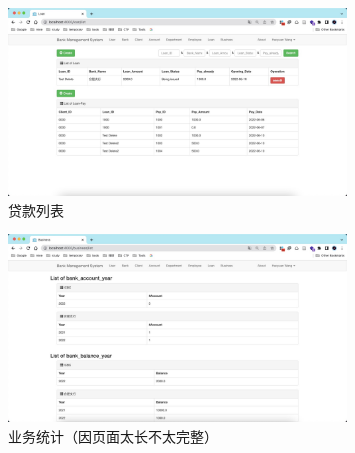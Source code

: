 \documentclass{article}
\begin{document}
    \begin{figure}[H]
        \centering
        \includegraphics[width=0.8\textwidth]{./fig/loan_list.jpg}
        \caption[loan_list]{贷款列表}
    \end{figure}
    \begin{figure}[H]
        \centering
        \includegraphics[width=0.8\textwidth]{./fig/business_list.jpg}
        \caption[business_list]{业务统计（因页面太长不太完整）}
    \end{figure}
\end{document}
